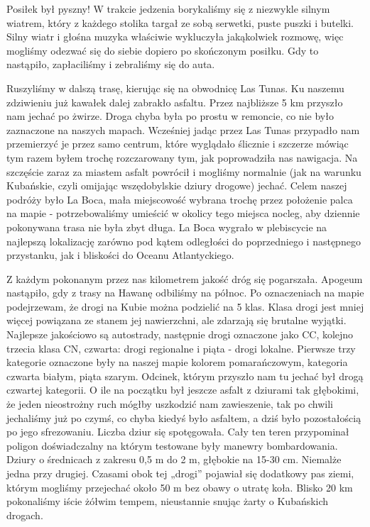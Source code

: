 Posiłek był pyszny!
W trakcie jedzenia borykaliśmy się z niezwykle silnym wiatrem, który z każdego stolika targał ze sobą serwetki, puste puszki i butelki.
Silny wiatr i głośna muzyka właściwie wykluczyła jakąkolwiek rozmowę, więc mogliśmy odezwać się do siebie dopiero po skończonym posiłku.
Gdy to nastąpiło, zapłaciliśmy i zebraliśmy się do auta.
\par Ruszyliśmy w dalszą trasę, kierując się na obwodnicę Las Tunas.
Ku naszemu zdziwieniu już kawałek dalej zabrakło asfaltu.
Przez najbliższe 5 km przyszło nam jechać po żwirze.
Droga chyba była po prostu w remoncie, co nie było zaznaczone na naszych mapach.
Wcześniej jadąc przez Las Tunas przypadło nam przemierzyć je przez samo centrum, które wyglądało ślicznie i szczerze mówiąc tym razem byłem trochę rozczarowany tym, jak poprowadziła nas nawigacja.
Na szczęście zaraz za miastem asfalt powrócił i mogliśmy normalnie (jak na warunku Kubańskie, czyli omijając wszędobylskie dziury drogowe) jechać.
Celem naszej podróży było La Boca, mała miejscowość wybrana trochę przez położenie palca na mapie - potrzebowaliśmy umieścić w okolicy tego miejsca nocleg, aby dziennie pokonywana trasa nie była zbyt długa. La Boca wygrało w plebiscycie na najlepszą lokalizację zarówno pod kątem odległości do poprzedniego i następnego przystanku, jak i bliskości do Oceanu Atlantyckiego.
\par Z każdym pokonanym przez nas kilometrem jakość dróg się pogarszała.
Apogeum nastąpiło, gdy z trasy na Hawanę odbiliśmy na północ.
Po oznaczeniach na mapie podejrzewam, że drogi na Kubie można podzielić na 5 klas.
Klasa drogi jest mniej więcej powiązana ze stanem jej nawierzchni, ale zdarzają się brutalne wyjątki.
Najlepsze jakościowo są autostrady, następnie drogi oznaczone jako CC, kolejno trzecia klasa CN, czwarta: drogi regionalne i piąta - drogi lokalne.
Pierwsze trzy kategorie oznaczone były na naszej mapie kolorem pomarańczowym, kategoria czwarta białym, piąta szarym.
Odcinek, którym przyszło nam tu jechać był drogą czwartej kategorii.
O ile na początku był jeszcze asfalt z dziurami tak głębokimi, że jeden nieostrożny ruch mógłby uszkodzić nam zawieszenie, tak po chwili jechaliśmy już po czymś, co chyba kiedyś było asfaltem, a dziś było pozostałością po jego sfrezowaniu.
Liczba dziur się spotęgowała.
Cały ten teren przypominał poligon doświadczalny na którym testowane były manewry bombardowania.
Dziury o średnicach z zakresu 0,5 m do 2 m, głębokie na 15-30 cm.
Niemalże jedna przy drugiej.
Czasami obok tej „drogi” pojawiał się dodatkowy pas ziemi, którym mogliśmy przejechać około 50 m bez obawy o utratę koła.
Blisko 20 km pokonaliśmy iście żółwim tempem, nieustannie snując żarty o Kubańskich drogach.


